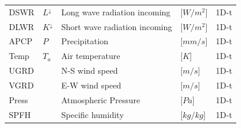 \documentclass[11pt,a4paper]{report}
\begin{document}
\begin{landscape}
\begin{table}[htbp]
\begin{tabular}{llp{10cm}ll}
DSWR   & $L^{\downarrow}$ & Long wave radiation incoming&[$W/m^2$] & 1D-t             \\
DLWR   & $K^{\downarrow}$ &Short wave radiation incoming&[$W/m^2$] & 1D-t             \\
APCP     & $P$   & Precipitation &[$mm/s$]                                           & 1D-t             \\
Temp     & $T_a$   & Air temperature & [$K$]                                            & 1D-t             \\
UGRD   && N-S wind speed & [$m/s$]                                      & 1D-t             \\
VGRD   && E-W wind speed & [$m/s$]                                      & 1D-t             \\
Press     &  & Atmospheric Pressure & [$Pa$]                                      & 1D-t             \\
SPFH      &  & Specific humidity & [$kg/kg$]                                      & 1D-t    \\
\bottomrule        
\end{tabular}
\end{table}



\end{landscape}
\end{document}
